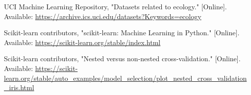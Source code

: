 \documentclass[conference]{IEEEtran}
\begin{document}
\begin{thebibliography}{9}
 UCI Machine Learning Repository, "Datasets related to ecology." [Online]. Available: \url{https://archive.ics.uci.edu/datasets?Keywords=ecology}

 Scikit-learn contributors, "scikit-learn: Machine Learning in Python." [Online]. Available: \url{https://scikit-learn.org/stable/index.html}

 Scikit-learn contributors, "Nested versus non-nested cross-validation." [Online]. Available: \url{https://scikit-learn.org/stable/auto_examples/model_selection/plot_nested_cross_validation_iris.html}
\end{thebibliography}
\end{document}
